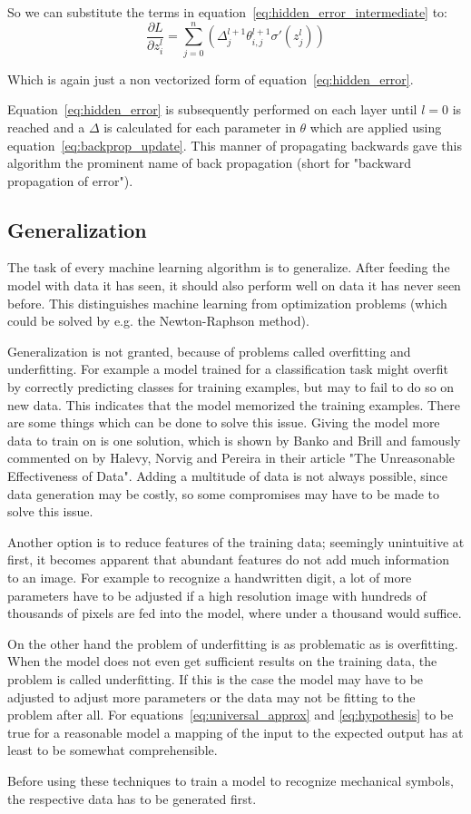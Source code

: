 So we can substitute the terms in equation~\eqref{eq:hidden_error_intermediate} to:
\begin{equation}
    \frac{\partial L}{\partial z^l_i} = \sum_{j=0}^n (\varDelta^{l+1}_j \theta^{l+1}_{i,j} \sigma'(z_j^l))
\end{equation}

Which is again just a non vectorized form of equation~\eqref{eq:hidden_error}.

Equation~\eqref{eq:hidden_error} is subsequently performed on each layer until $l=0$ is reached and a $\varDelta$ is calculated for each parameter in $\theta$ which are applied using equation~\eqref{eq:backprop_update}.
This manner of propagating backwards gave this algorithm the prominent name of back propagation (short for "backward propagation of error"\cite{Rumelhart1986}).

\subsection{Generalization}

The task of every machine learning algorithm is to generalize.
After feeding the model with data it has seen, it should also perform well on data it has never seen before.
This distinguishes machine learning from optimization problems (which could be solved by e.g. the Newton-Raphson method).

Generalization is not granted, because of problems called overfitting and underfitting.
For example a model trained for a classification task might overfit by correctly predicting classes for training examples, but may to fail to do so on new data.
This indicates that the model memorized the training examples.
There are some things which can be done to solve this issue.
Giving the model more data to train on is one solution, which is shown by Banko and Brill\cite{Banko2001} and famously commented on by Halevy, Norvig and Pereira in their article "The Unreasonable Effectiveness of Data"\cite{Halevy2009}.
Adding a multitude of data is not always possible, since data generation may be costly, so some compromises may have to be made to solve this issue.

Another option is to reduce features of the training data; seemingly unintuitive at first, it becomes apparent that abundant features do not add much information to an image. For example to recognize a handwritten digit, a lot of more parameters have to be adjusted if a high resolution image with hundreds of thousands of pixels are fed into the model, where under a thousand would suffice\cite{Nielsen2015}.

On the other hand the problem of underfitting is as problematic as is overfitting.
When the model does not even get sufficient results on the training data, the problem is called underfitting.
If this is the case the model may have to be adjusted to adjust more parameters or the data may not be fitting to the problem after all.
For equations~\eqref{eq:universal_approx} and \eqref{eq:hypothesis} to be true for a reasonable model a mapping of the input to the expected output has at least to be somewhat comprehensible.

Before using these techniques to train a model to recognize mechanical symbols, the respective data has to be generated first.
